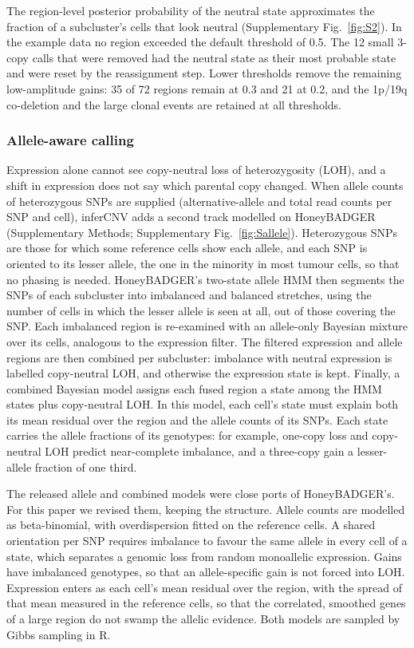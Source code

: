The region-level posterior probability of the neutral state approximates the fraction of a subcluster's cells that look neutral (Supplementary Fig.~\ref{fig:S2}). In the example data no region exceeded the default threshold of 0.5. The 12 small 3-copy calls that were removed had the neutral state as their most probable state and were reset by the reassignment step. Lower thresholds remove the remaining low-amplitude gains: 35 of 72 regions remain at 0.3 and 21 at 0.2, and the 1p/19q co-deletion and the large clonal events are retained at all thresholds.

\subsubsection{Allele-aware calling}

Expression alone cannot see copy-neutral loss of heterozygosity (LOH), and a shift in expression does not say which parental copy changed. When allele counts of heterozygous SNPs are supplied (alternative-allele and total read counts per SNP and cell), inferCNV adds a second track modelled on HoneyBADGER \citep{fan2018} (Supplementary Methods; Supplementary Fig.~\ref{fig:Sallele}). Heterozygous SNPs are those for which some reference cells show each allele, and each SNP is oriented to its lesser allele, the one in the minority in most tumour cells, so that no phasing is needed. HoneyBADGER's two-state allele HMM then segments the SNPs of each subcluster into imbalanced and balanced stretches, using the number of cells in which the lesser allele is seen at all, out of those covering the SNP. Each imbalanced region is re-examined with an allele-only Bayesian mixture over its cells, analogous to the expression filter. The filtered expression and allele regions are then combined per subcluster: imbalance with neutral expression is labelled copy-neutral LOH, and otherwise the expression state is kept. Finally, a combined Bayesian model assigns each fused region a state among the HMM states plus copy-neutral LOH. In this model, each cell's state must explain both its mean residual over the region and the allele counts of its SNPs. Each state carries the allele fractions of its genotypes: for example, one-copy loss and copy-neutral LOH predict near-complete imbalance, and a three-copy gain a lesser-allele fraction of one third.

The released allele and combined models were close ports of HoneyBADGER's. For this paper we revised them, keeping the structure. Allele counts are modelled as beta-binomial, with overdispersion fitted on the reference cells. A shared orientation per SNP requires imbalance to favour the same allele in every cell of a state, which separates a genomic loss from random monoallelic expression. Gains have imbalanced genotypes, so that an allele-specific gain is not forced into LOH. Expression enters as each cell's mean residual over the region, with the spread of that mean measured in the reference cells, so that the correlated, smoothed genes of a large region do not swamp the allelic evidence. Both models are sampled by Gibbs sampling in R.

